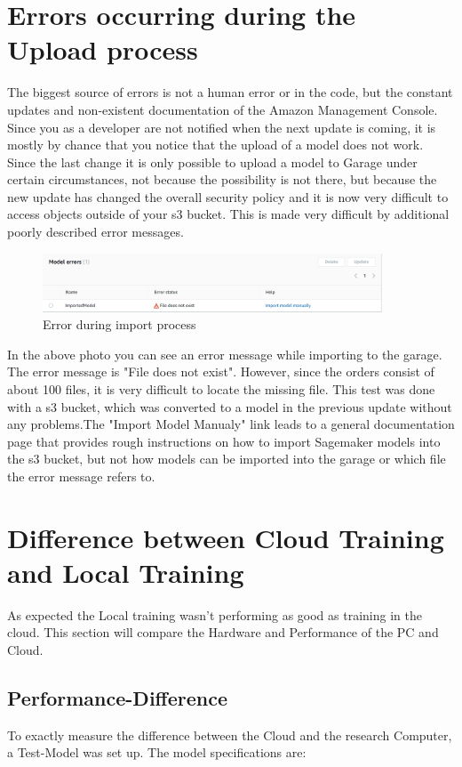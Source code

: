 \section{Errors occurring during the Upload process}
The biggest source of errors is not a human error or in the code, but the constant updates and non-existent documentation of the Amazon Management Console. Since you as a developer are not notified when the next update is coming, it is mostly by chance that you notice that the upload of a model does not work. Since the last change it is only possible to upload a model to Garage under certain circumstances, not because the possibility is not there, but because the new update has changed the overall security policy and it is now very difficult to access objects outside of your s3 bucket. This is made very difficult by additional poorly described error messages.
\begin{figure}[H]
    \centering
    \includegraphics[width=0.9\textwidth]{images/ErrorDuringUpload.PNG}
    \caption[]{Error during import process\footnotemark}
    \label{fig:console-output-start}
\end{figure}
In the above photo you can see an error message while importing to the garage. The error message is "File does not exist". However, since the orders consist of about 100 files, it is very difficult to locate the missing file. This test was done with a s3 bucket, which was converted to a model in the previous update without any problems.The "Import Model Manualy" link leads to a general documentation page that provides rough instructions on how to import Sagemaker models into the s3 bucket, but not how models can be imported into the garage or which file the error message refers to.


\section{Difference between Cloud Training and Local Training}
As expected the Local training wasn't performing as good as training in the cloud. This section will compare the Hardware and Performance of the PC and Cloud. 


\subsection{Performance-Difference}
To exactly measure the difference between the Cloud and the research Computer, a Test-Model was set up. The model specifications are: 
 
